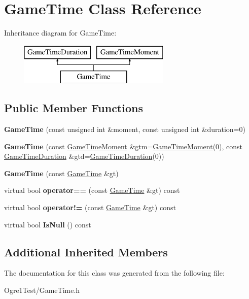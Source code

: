 \hypertarget{class_game_time}{}\section{Game\+Time Class Reference}
\label{class_game_time}
Inheritance diagram for Game\+Time\+:\begin{figure}[H]
\begin{center}
\leavevmode
\includegraphics[height=2.000000cm]{class_game_time}
\end{center}
\end{figure}
\subsection*{Public Member Functions}
\begin{DoxyCompactItemize}
\item 
{\bfseries Game\+Time} (const unsigned int \&moment, const unsigned int \&duration=0)\hypertarget{class_game_time_ae98d22a29433dfa7458386e775d4b4b5}{}\label{class_game_time_ae98d22a29433dfa7458386e775d4b4b5}

\item 
{\bfseries Game\+Time} (const \hyperlink{class_game_time_moment}{Game\+Time\+Moment} \&gtm=\hyperlink{class_game_time_moment}{Game\+Time\+Moment}(0), const \hyperlink{class_game_time_duration}{Game\+Time\+Duration} \&gtd=\hyperlink{class_game_time_duration}{Game\+Time\+Duration}(0))\hypertarget{class_game_time_a2738fd0efd5b0e3972aefd6ed6bf2334}{}\label{class_game_time_a2738fd0efd5b0e3972aefd6ed6bf2334}

\item 
{\bfseries Game\+Time} (const \hyperlink{class_game_time}{Game\+Time} \&gt)\hypertarget{class_game_time_a6e82ffaf9f85006f321cce13f7bcf56b}{}\label{class_game_time_a6e82ffaf9f85006f321cce13f7bcf56b}

\item 
virtual bool {\bfseries operator==} (const \hyperlink{class_game_time}{Game\+Time} \&gt) const \hypertarget{class_game_time_aab32812d5ff79fb5cf6f3489b5798410}{}\label{class_game_time_aab32812d5ff79fb5cf6f3489b5798410}

\item 
virtual bool {\bfseries operator!=} (const \hyperlink{class_game_time}{Game\+Time} \&gt) const \hypertarget{class_game_time_a71ed6d8baaf04ea84ab6d580c420f128}{}\label{class_game_time_a71ed6d8baaf04ea84ab6d580c420f128}

\item 
virtual bool {\bfseries Is\+Null} () const \hypertarget{class_game_time_a14d6b9d812b4ab47a00a71cd6b54c11d}{}\label{class_game_time_a14d6b9d812b4ab47a00a71cd6b54c11d}

\end{DoxyCompactItemize}
\subsection*{Additional Inherited Members}


The documentation for this class was generated from the following file\+:\begin{DoxyCompactItemize}
\item 
Ogre1\+Test/Game\+Time.\+h\end{DoxyCompactItemize}
